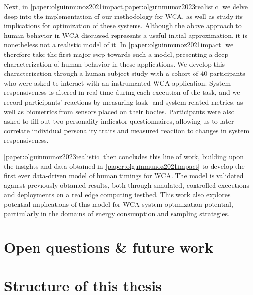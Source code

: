 Next, in \cref{paper:olguinmunoz2021impact,paper:olguinmunoz2023realistic} we delve deep into the implementation of our methodology for \gls{WCA}, as well as study its implications for optimization of these systems.
Although the above approach to human behavior in \gls{WCA} discussed represents a useful initial approximation, it is nonetheless not a realistic model of it.
In \cref{paper:olguinmunoz2021impact} we therefore take the first major step towards such a model, presenting a deep characterization of human behavior in these applications.
We develop this characterization through a human subject study with a cohort of \num{40} participants who were asked to interact with an instrumented \gls{WCA} application.
System responsiveness is altered in real-time during each execution of the task, and we record participants' reactions by measuring task- and system-related metrics, as well as biometrics from sensors placed on their bodies.
Participants were also asked to fill out two personality indicator questionnaires, allowing us to later correlate individual personality traits and measured reaction to changes in system responsiveness.

\cref{paper:olguinmunoz2023realistic} then concludes this line of work, building upon the insights and data obtained in \cref{paper:olguinmunoz2021impact} to develop the first ever data-driven model of human timings for \gls{WCA}.
The model is validated against previously obtained results, both through simulated, controlled executions and deployments on a real edge computing testbed.
This work also explores potential implications of this model for \gls{WCA} system optimization potential, particularly in the domains of energy consumption and sampling strategies.

\section{Open questions \& future work}

\section{Structure of this thesis}

